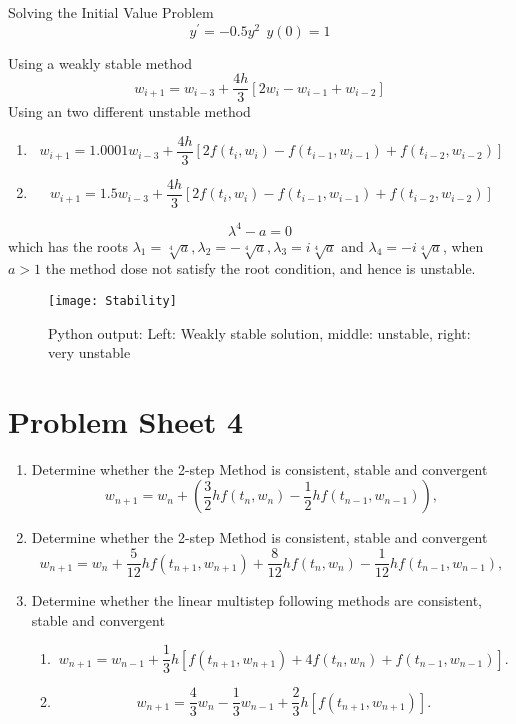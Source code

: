 \begin{example}
Solving the Initial Value Problem 
\[ y^{'}=-0.5y^{2} \ \ y(0)=1 \]

Using a weakly stable method
\[ w_{i+1}=w_{i-3}+\frac{4h}{3}[2w_{i}-w_{i-1}+w_{i-2}] \]
Using an two different unstable method
\begin{enumerate}
\item
\[ w_{i+1}=1.0001w_{i-3}+\frac{4h}{3}[2f(t_i,w_{i})-f(t_{i-1},w_{i-1})+f(t_{i-2},w_{i-2})] \]
\item
\[ w_{i+1}=1.5w_{i-3}+\frac{4h}{3}[2f(t_i,w_{i})-f(t_{i-1},w_{i-1})+f(t_{i-2},w_{i-2})] \]
\end{enumerate}
\[\lambda^4-a =0\]
which has the roots $\lambda_1=\sqrt[4]{a},\lambda_2=-\sqrt[4]{a},\lambda_3=i\sqrt[4]{a}$ and $\lambda_4=-i\sqrt[4]{a}$, when $a>1$ the method dose not satisfy the root condition, and hence is unstable.
\end{example}
\begin{figure}[H]
\centering
\texttt{[image: Stability]}
\caption{Python output: Left: Weakly stable solution, middle: unstable, right: very unstable }
\label{Stability}
\end{figure}


\newpage
\section{Problem Sheet 4}
\begin{enumerate}
\item
Determine whether the 2-step  Method is consistent, stable and convergent 
\[ w_{n+1}=w_n+(\frac{3}{2}hf(t_{n},w_{n})-\frac{1}{2}hf(t_{n-1},w_{n-1})),\]

\item
Determine whether the 2-step  Method is consistent, stable and convergent 
\[ w_{n+1}=w_n+\frac{5}{12}hf(t_{n+1},w_{n+1})+\frac{8}{12}hf(t_{n},w_{n})-\frac{1}{12}hf(t_{n-1},w_{n-1}),\]

\item
Determine whether the linear multistep following methods are consistent, stable and convergent 
\begin{enumerate}
\item
\[w_{n+1}=w_{n-1}+\frac{1}{3}h[f(t_{n+1},w_{n+1})+4f(t_n,w_n)+f(t_{n-1},w_{n-1})].\]

\item

\[w_{n+1}=\frac{4}{3}w_{n}-\frac{1}{3}w_{n-1}+\frac{2}{3}h[f(t_{n+1},w_{n+1})]. \]

\end{enumerate}


\end{enumerate}
\newpage


